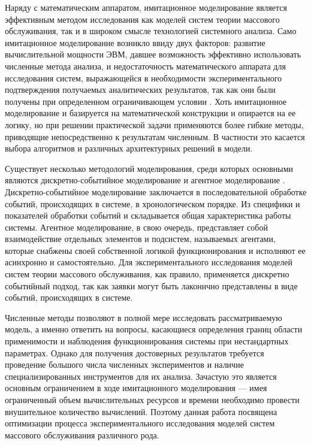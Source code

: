Наряду с математическим аппаратом, имитационное моделирование \cite{задорожный2011методы} является эффективным методом исследования как моделей систем теории массового обслуживания, так и в широком смысле технологией системного анализа. Само имитационное моделирование возникло ввиду двух факторов: развитие вычислительной мощности ЭВМ, давшее возможность эффективно использовать численные метода анализа, и недостаточность математического аппарата для исследования систем, выражающейся в необходимости экспериментального подтверждения получаемых аналитических результатов, так как они были получены при определенном ограничивающем условии \cite{горбунов2007парадигмы}. Хоть имитационное моделирование и базируется на математической конструкции и опирается на ее логику, но при решении практической задачи применяются более гибкие методы, приводящие непосредственно к результатам численным. В частности это касается выбора алгоритмов и различных архитектурных решений в модели.

Существует несколько методологий моделирования, среди которых основными являются дискретно-событийное моделирование \cite{илюхина2015дискретно,григорьева2014дискретно} и агентное моделирование \cite{лебедюк2017агентное}. Дискретно-событийное моделирование заключается в последовательной обработке событий, происходящих в системе, в хронологическом порядке. Из специфики и показателей обработки событий и складывается общая характеристика работы системы. Агентное моделирование, в свою очередь, представляет собой взаимодействие отдельных элементов и подсистем, называемых агентами, которые снабжены своей собственной логикой функционирования и исполняют ее асинхронно и самостоятельно. Для экспериментального исследования моделей систем теории массового обслуживания, как правило, применяется дискретно событийный подход, так как заявки могут быть лаконично представлены в виде событий, происходящих в системе.

 Численные методы позволяют в полной мере исследовать рассматриваемую модель, а именно ответить на вопросы, касающиеся определения границ области применимости и наблюдения функционирования системы при нестандартных параметрах. Однако для получения достоверных результатов требуется проведение большого числа численных экспериментов и наличие специализированных инструментов для их анализа. Зачастую это является основным ограничением в ходе имитационного моделирования --- имея ограниченный объем вычислительных ресурсов и времени необходимо провести внушительное количество вычислений. Поэтому данная работа посвящена оптимизации процесса экспериментального исследования моделей систем массового обслуживания различного рода. 
 
